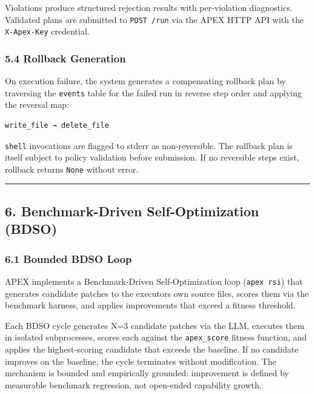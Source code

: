 \documentclass[
]{article}
\begin{document}
Violations produce structured rejection results with per-violation
diagnostics. Validated plans are submitted to \texttt{POST\ /run} via
the APEX HTTP API with the \texttt{X-Apex-Key} credential.

\subsubsection{5.4 Rollback Generation}\label{54-rollback-generation}

On execution failure, the system generates a compensating rollback plan
by traversing the \texttt{events} table for the failed run in reverse
step order and applying the reversal map:

\begin{verbatim}
write_file → delete_file
\end{verbatim}

\texttt{shell} invocations are flagged to stderr as non-reversible. The
rollback plan is itself subject to policy validation before submission.
If no reversible steps exist, rollback returns \texttt{None} without
error.

\begin{center}\rule{0.5\linewidth}{0.5pt}\end{center}

\subsection{6. Benchmark-Driven Self-Optimization
(BDSO)}\label{6-benchmark-driven-self-optimization-bdso}

\subsubsection{6.1 Bounded BDSO Loop}\label{61-bounded-bdso-loop}

APEX implements a Benchmark-Driven Self-Optimization loop
(\texttt{apex\ rsi}) that generates candidate patches to the
executor\textquotesingle s own source files, scores them via the
benchmark harness, and applies improvements that exceed a fitness
threshold.

Each BDSO cycle generates N=3 candidate patches via the LLM, executes
them in isolated subprocesses, scores each against the
\texttt{apex\_score} fitness function, and applies the highest-scoring
candidate that exceeds the baseline. If no candidate improves on the
baseline, the cycle terminates without modification. The mechanism is
bounded and empirically grounded: improvement is defined by measurable
benchmark regression, not open-ended capability growth.
\end{document}
